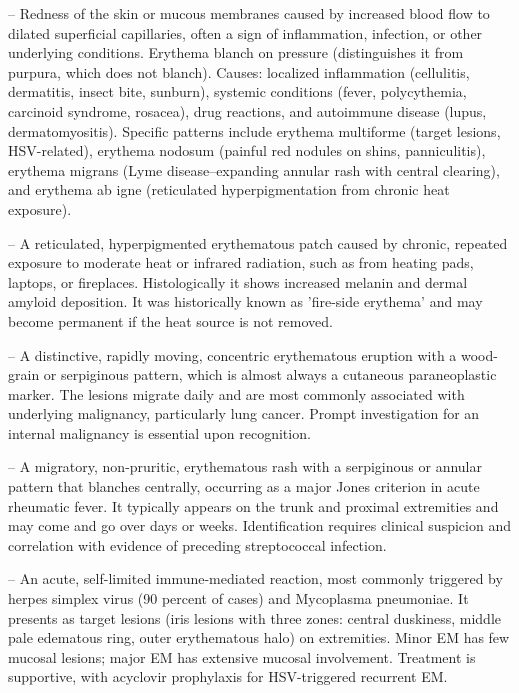 -- Redness of the skin or mucous membranes caused by increased blood flow to dilated superficial capillaries, often a sign of inflammation, infection, or other underlying conditions. Erythema blanch on pressure (distinguishes it from purpura, which does not blanch). Causes: localized inflammation (cellulitis, dermatitis, insect bite, sunburn), systemic conditions (fever, polycythemia, carcinoid syndrome, rosacea), drug reactions, and autoimmune disease (lupus, dermatomyositis). Specific patterns include erythema multiforme (target lesions, HSV-related), erythema nodosum (painful red nodules on shins, panniculitis), erythema migrans (Lyme disease--expanding annular rash with central clearing), and erythema ab igne (reticulated hyperpigmentation from chronic heat exposure).

-- A reticulated, hyperpigmented erythematous patch caused by chronic, repeated exposure to moderate heat or infrared radiation, such as from heating pads, laptops, or fireplaces. Histologically it shows increased melanin and dermal amyloid deposition. It was historically known as 'fire-side erythema' and may become permanent if the heat source is not removed.

-- A distinctive, rapidly moving, concentric erythematous eruption with a wood-grain or serpiginous pattern, which is almost always a cutaneous paraneoplastic marker. The lesions migrate daily and are most commonly associated with underlying malignancy, particularly lung cancer. Prompt investigation for an internal malignancy is essential upon recognition.

-- A migratory, non-pruritic, erythematous rash with a serpiginous or annular pattern that blanches centrally, occurring as a major Jones criterion in acute rheumatic fever. It typically appears on the trunk and proximal extremities and may come and go over days or weeks. Identification requires clinical suspicion and correlation with evidence of preceding streptococcal infection.

-- An acute, self-limited immune-mediated reaction, most commonly triggered by herpes simplex virus (90 percent of cases) and Mycoplasma pneumoniae. It presents as target lesions (iris lesions with three zones: central duskiness, middle pale edematous ring, outer erythematous halo) on extremities. Minor EM has few mucosal lesions; major EM has extensive mucosal involvement. Treatment is supportive, with acyclovir prophylaxis for HSV-triggered recurrent EM.

